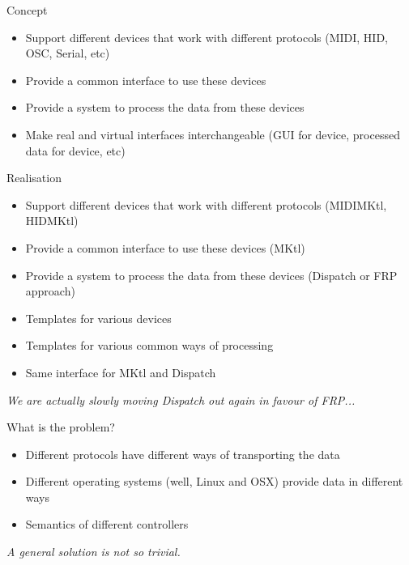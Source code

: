 \documentclass[pdf,slideColor,colorBG,accumulate,total]{prosper}
\begin{document}
\begin{slide}{Concept}
 
 \vspace*{0.5cm}
 \begin{itemize}
  \item Support different devices that work with different protocols (MIDI, HID, OSC, Serial, etc)
  \item Provide a common interface to use these devices
  \item Provide a system to process the data from these devices
  \item Make real and virtual interfaces interchangeable (GUI for device, processed data for device, etc)
 \end{itemize}

\end{slide}

\begin{slide}{Realisation}
 
 \vspace*{0.5cm}
 \begin{itemize}
  \item Support different devices that work with different protocols (MIDIMKtl, HIDMKtl)
  \item Provide a common interface to use these devices (MKtl)
  \item Provide a system to process the data from these devices (Dispatch or FRP approach)
  \item Templates for various devices
  \item Templates for various common ways of processing
  \item Same interface for MKtl and Dispatch
 \end{itemize}

 \vspace*{0.5cm}
 
 \textit{We are actually slowly moving Dispatch out again in favour of FRP...}
 
\end{slide}

\begin{slide}{What is the problem?}

\vspace*{1cm}

\begin{itemize}
 \item Different protocols have different ways of transporting the data
 \item Different operating systems (well, Linux and OSX) provide data in different ways
 \item Semantics of different controllers
\end{itemize}

\vspace*{1cm}

\begin{center}
\textit{ A general solution is not so trivial.}
\end{center}

 
\end{slide}
\end{document}
